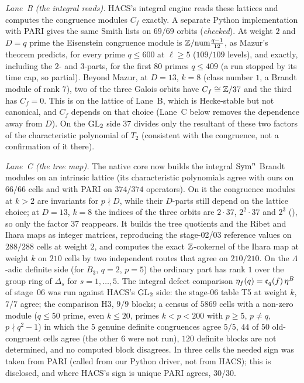 \emph{Lane~B (the integral reads).} HACS's integral engine reads these lattices and computes the congruence modules $C_f$ exactly.
A separate Python implementation with PARI gives the same Smith lists on $69/69$ orbits (\emph{checked}). At weight $2$ and $D=q$
prime the Eisenstein congruence module is $\mathbb{Z}/\mathrm{num}\frac{q-1}{12}$, as Mazur's theorem predicts, for every prime $q\le600$ at
$\ell\ge5$ ($109/109$ levels), and exactly, including the $2$- and $3$-parts, for the first $80$ primes $q\le409$ (a run stopped by
its time cap, so partial). Beyond Mazur, at $D=13$, $k=8$ (class number $1$, a Brandt module of rank $7$), two of the three Galois orbits have
$C_f\cong\mathbb{Z}/37$ and the third has $C_f=0$. This is on the lattice of Lane~B, which is Hecke-stable but not canonical, and $C_f$
depends on that choice (Lane~C below removes the dependence away from $D$). On the $\mathrm{GL}_2$ side $37$ divides only the
resultant of these two factors of the characteristic polynomial of $T_2$ (consistent with the congruence, not a confirmation of
it there).

\emph{Lane~C (the tree map).} The native core now builds the integral $\mathrm{Sym}^n$ Brandt modules on an intrinsic lattice (its
characteristic polynomials agree with ours on $66/66$ cells and with PARI on $374/374$ operators). On it the congruence modules
at $k>2$ are invariants for $p\nmid D$, while their $D$-parts still depend on the lattice choice; at $D=13$, $k=8$ the indices of
the three orbits are $2\cdot37$, $2^2\cdot37$ and $2^3$ (), so only the factor
$37$ reappears. It builds the tree quotients and the Ribet and Ihara maps as integer matrices, reproducing the stage-02/03
reference values on $288/288$ cells at weight $2$, and computes the exact $\mathbb{Z}$-cokernel of the Ihara map at weight $k$ on $210$
cells by two independent routes that agree on $210/210$. On the $\Lambda$-adic definite side (for $B_3$, $q=2$, $p=5$) the ordinary
part has rank $1$ over the group ring of $\Delta_s$ for $s=1,\dots,5$. The integral defect comparison $\eta_f(q)=\mathfrak{c}_q(f)\,\eta^B$ of stage~06 was run against
HACS's $\mathrm{GL}_2$ side: the stage-06 table T5 at weight $k$, $7/7$ agree; the comparison H3, $9/9$ blocks; a census of $5869$ cells with a
non-zero module ($q\le50$ prime, even $k\le20$, primes $k<p<200$ with $p\ge5$, $p\ne q$, $p\nmid q^2-1$) in which the $5$ genuine definite congruences agree $5/5$, $44$ of
$50$ old-congruent cells agree (the other $6$ were not run), $120$ definite blocks are not determined, and no computed block
disagrees. In three cells the needed sign was taken from PARI (called from our Python driver, not from HACS); this is disclosed,
and where HACS's sign is unique PARI agrees, $30/30$.

